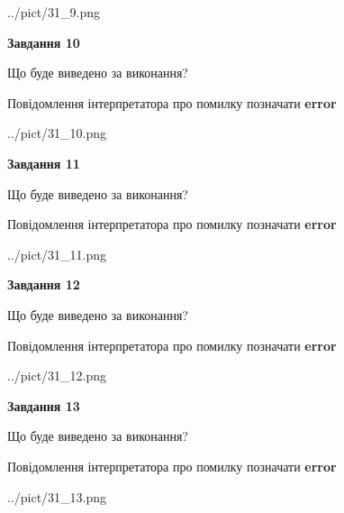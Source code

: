 \documentclass[11pt, ukrainian]{article}
\begin{document}
{\begin {large}
\begin{center}
	{../pict/31_9.png}
\end{center}
\newpage

{\begin {center}\textbf{Завдання 10}\end {center}}\par
Що буде виведено за виконання? \par
Повідомлення інтерпретатора про помилку позначати \textbf{error}

\begin{center}
	{../pict/31_10.png}
\end{center}
\newpage

{\begin {center}\textbf{Завдання 11}\end {center}}\par
Що буде виведено за виконання? \par
Повідомлення інтерпретатора про помилку позначати \textbf{error}

\begin{center}
	{../pict/31_11.png}
\end{center}
\newpage

{\begin {center}\textbf{Завдання 12}\end {center}}\par
Що буде виведено за виконання? \par
Повідомлення інтерпретатора про помилку позначати \textbf{error}

\begin{center}
	{../pict/31_12.png}
\end{center}
\newpage

{\begin {center}\textbf{Завдання 13}\end {center}}\par
Що буде виведено за виконання? \par
Повідомлення інтерпретатора про помилку позначати \textbf{error}

\begin{center}
	{../pict/31_13.png}
\end{center}
\newpage


\end{large}}
\end{document}
